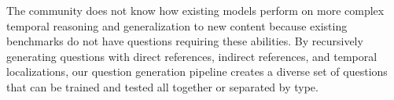 \documentclass[10pt,twocolumn,letterpaper]{article}
\newcommand{\rak}[1]{{\color{red}{rak: #1}}}
\newcommand{\mgm}[1]{{\color{cyan}{mgm: #1}}}
\begin{document}
The community does not know how existing models perform on more complex temporal reasoning and generalization to new content because existing benchmarks do not have questions requiring these abilities. By recursively generating questions with direct references, indirect references, and temporal localizations, our question generation pipeline creates a diverse set of questions that can be trained and tested all together or separated by type. \mgm{making the same pont like 50 different times I want to restructure it a bit to condense all that into one area b/c now it kinda rambles}

\end{document}
